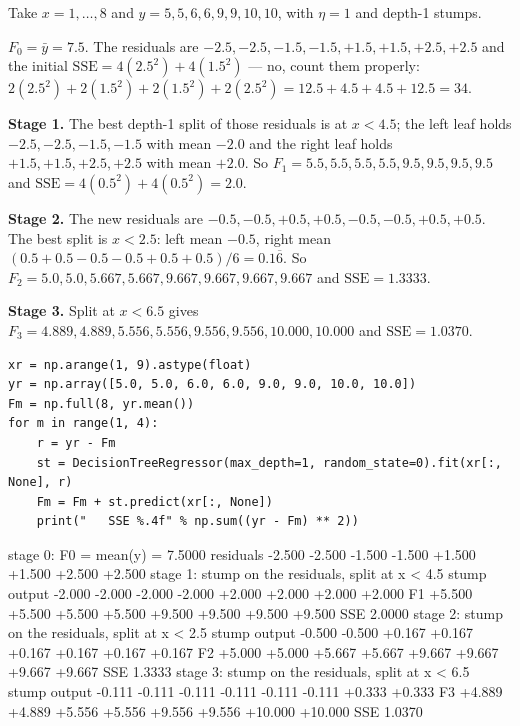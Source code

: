 \documentclass[11pt]{article}
\begin{document}
\begin{worked}
Take $x = 1, \dots, 8$ and $y = 5, 5, 6, 6, 9, 9, 10, 10$, with $\eta = 1$ and
depth-1 stumps.

$F_0 = \bar y = 7.5$. The residuals are $-2.5, -2.5, -1.5, -1.5, +1.5, +1.5,
+2.5, +2.5$ and the initial $\mathrm{SSE} = 4(2.5^2) + 4(1.5^2)$ --- no,
count them properly: $2(2.5^2) + 2(1.5^2) + 2(1.5^2) + 2(2.5^2)
= 12.5 + 4.5 + 4.5 + 12.5 = 34$.

\textbf{Stage 1.} The best depth-1 split of those residuals is at $x < 4.5$;
the left leaf holds $-2.5, -2.5, -1.5, -1.5$ with mean $-2.0$ and the right
leaf holds $+1.5, +1.5, +2.5, +2.5$ with mean $+2.0$. So
$F_1 = 5.5, 5.5, 5.5, 5.5, 9.5, 9.5, 9.5, 9.5$ and
$\mathrm{SSE} = 4(0.5^2) + 4(0.5^2) = 2.0$.

\textbf{Stage 2.} The new residuals are $-0.5, -0.5, +0.5, +0.5, -0.5, -0.5,
+0.5, +0.5$. The best split is $x < 2.5$: left mean $-0.5$, right mean
$(0.5 + 0.5 - 0.5 - 0.5 + 0.5 + 0.5)/6 = 0.1\overline{6}$. So
$F_2 = 5.0, 5.0, 5.667, 5.667, 9.667, 9.667, 9.667, 9.667$ and
$\mathrm{SSE} = 1.3333$.

\textbf{Stage 3.} Split at $x < 6.5$ gives $F_3 = 4.889, 4.889, 5.556, 5.556,
9.556, 9.556, 10.000, 10.000$ and $\mathrm{SSE} = 1.0370$.
\end{worked}

\begin{lstlisting}
xr = np.arange(1, 9).astype(float)
yr = np.array([5.0, 5.0, 6.0, 6.0, 9.0, 9.0, 10.0, 10.0])
Fm = np.full(8, yr.mean())
for m in range(1, 4):
    r = yr - Fm
    st = DecisionTreeRegressor(max_depth=1, random_state=0).fit(xr[:, None], r)
    Fm = Fm + st.predict(xr[:, None])
    print("   SSE %.4f" % np.sum((yr - Fm) ** 2))
\end{lstlisting}
\begin{codeout}
stage 0: F0 = mean(y) = 7.5000
   residuals -2.500 -2.500 -1.500 -1.500 +1.500 +1.500 +2.500 +2.500
stage 1: stump on the residuals, split at x < 4.5
   stump output -2.000 -2.000 -2.000 -2.000 +2.000 +2.000 +2.000 +2.000
   F1           +5.500 +5.500 +5.500 +5.500 +9.500 +9.500 +9.500 +9.500
   SSE 2.0000
stage 2: stump on the residuals, split at x < 2.5
   stump output -0.500 -0.500 +0.167 +0.167 +0.167 +0.167 +0.167 +0.167
   F2           +5.000 +5.000 +5.667 +5.667 +9.667 +9.667 +9.667 +9.667
   SSE 1.3333
stage 3: stump on the residuals, split at x < 6.5
   stump output -0.111 -0.111 -0.111 -0.111 -0.111 -0.111 +0.333 +0.333
   F3           +4.889 +4.889 +5.556 +5.556 +9.556 +9.556 +10.000 +10.000
   SSE 1.0370
\end{codeout}
\end{document}
